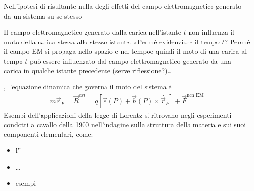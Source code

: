 \documentclass[letterpaper,10pt,italian]{jupyterBook}
\begin{document}
\sphinxAtStartPar
Nell’ipotesi di risultante nulla degli effetti del campo elettromagnetico generato da un sistema su se stesso%
\begin{footnote}[2]\sphinxAtStartFootnote
Il campo elettromagnetico generato dalla carica nell’istante \(t\) non influenza il moto della carica stessa allo stesso istante. xPerché evidenziare il tempo \(t\)? Perché il campo EM si propaga nello spazio e nel tempoe quindi il moto di una carica al tempo \(t\) può essere influenzato dal campo elettromagnetico generato da una carica in qualche istante precedente (serve riflessione?)…
%
\end{footnote}, l’equazione dinamica che governa il moto del sistema è
\begin{equation*}
\begin{split}m \ddot{ \vec{r}_P } = \vec{R}^{ext} = q \left[ \vec{e}(P) + \vec{b}(P) \times \dot{\vec{r}_P} \right] + \vec{F}^{\text{non EM}}\end{split}
\end{equation*}
\sphinxAtStartPar
Esempi dell’applicazioni della legge di Lorentz si ritrovano negli esperimenti condotti a cavallo della 1900 nell’indagine sulla struttura della materia e sui suoi componenti elementari, come:
\begin{itemize}
\item {} 
\sphinxAtStartPar
l”{\hyperref[\detokenize{ch/modern/experiments:modern-experiments-thomson-electron}]{}}

\item {} 
\sphinxAtStartPar
…

\item {} 
\sphinxAtStartPar
{} esempi

\end{itemize}
\end{document}
